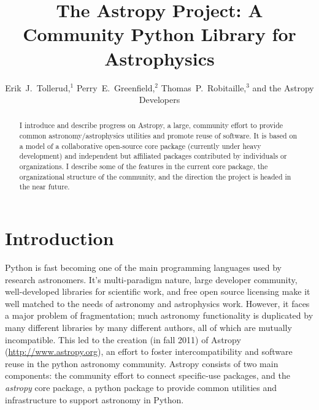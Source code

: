 

\resetcounters



\title{The Astropy Project: A Community Python Library for Astrophysics}
\author{Erik~J.~Tollerud,$^1$ Perry~E.~Greenfield,$^2$ Thomas~P.~Robitaille,$^3$ and the Astropy Developers
}


\begin{abstract}
I introduce and describe progress on Astropy, a large, community effort to provide common astronomy/astrophysics utilities and promote reuse of software. It is based on a model of a collaborative open-source core package (currently under heavy development) and independent but affiliated packages contributed by individuals or organizations. I  describe some of the features in the current core package, the organizational structure of the community, and the direction the project is headed in the near future.\end{abstract}

\section{Introduction}
Python is fast becoming one of the main programming languages used by research astronomers. It's multi-paradigm nature, large developer community, well-developed libraries for scientific work, and free open source licensing make it well matched to the needs of astronomy and astrophysics work. However, it faces a major problem of fragmentation; much astronomy functionality is duplicated by many different libraries by many different authors, all of which are mutually incompatible.  This led to the creation (in fall 2011) of Astropy (\url{http://www.astropy.org}), an effort to foster intercompatibility and software reuse in the python astronomy community. Astropy consists of two main components: the  community effort to connect specific-use packages, and the {\it astropy} core package, a python package to provide common utilities and infrastructure to support astronomy in Python.

